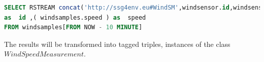 \documentclass[runningheads,a4paper]{llncs}
\begin{document}
\begin{lstlisting}[style=HaskellSNEE,language=SQL,frame=none]
SELECT RSTREAM concat('http://ssg4env.eu#WindSM',windsensor.id,windsensor.ts )
as  id ,( windsamples.speed ) as  speed
FROM windsamples[FROM NOW - 10 MINUTE]
\end{lstlisting}
%
The results will be transformed into tagged triples, instances of the class \\ $WindSpeedMeasurement$.


%

%
%







\end{document}
